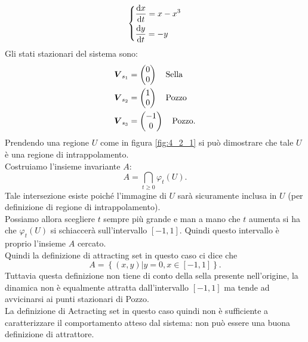 \begin{exmp}
    \[
    \begin{dcases}
    \frac{\text{d} x}{\text{d} t} = x-x^3\\
    \frac{\text{d} y}{\text{d} t} = -y	
    \end{dcases}
    \]
    Gli stati stazionari del sistema sono: 
    \[\begin{aligned}
	& \boldsymbol{V}_{s_1} = \begin{pmatrix} 0 \\ 0 \end{pmatrix} \quad  \text{Sella}\\
	& \boldsymbol{V}_{s_2} = \begin{pmatrix} 1 \\ 0 \end{pmatrix} \quad  \text{Pozzo}\\
	& \boldsymbol{V}_{s_3} = \begin{pmatrix} -1 \\ 0 \end{pmatrix} \quad  \text{Pozzo}
    .\end{aligned}\]
    Prendendo una regione $U$ come in figura \ref{fig:4_2_1} si può dimostrare che tale $U$ è una regione di intrappolamento.\\
    Costruiamo l'insieme invariante $A$:
    \[
	A = \bigcap\limits_{t\ge 0}\varphi_t(U) 
    .\] 
    Tale intersezione esiste poiché l'immagine di $U$ sarà sicuramente inclusa in $U$ (per definizione di regione di intrappolamento).\\
    Possiamo allora scegliere $t$ sempre più grande e man a mano che $t$ aumenta si ha che $\varphi_t(U)$ si schiaccerà sull'intervallo $\left[-1, 1\right]$. Quindi questo intervallo è proprio l'insieme $A$ cercato.\\
    Quindi la definizione di attracting set in questo caso ci dice che 
    \[
        A = \left\{(x, y) | y = 0, x \in \left[-1, 1\right] \right\}
    .\] 
    Tuttavia questa definizione non tiene di conto della sella presente nell'origine, la dinamica non è equalmente attratta dall'intervallo $\left[-1, 1\right]$ ma tende ad avvicinarsi ai punti stazionari di Pozzo. \\
    La definizione di Actracting set in questo caso quindi non è sufficiente a caratterizzare il comportamento atteso dal sistema: non può essere una buona definizione di attrattore.
\end{exmp}
